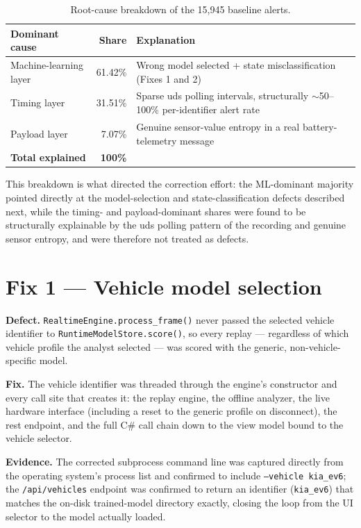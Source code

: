 \begin{table}[H]
\centering
\caption{Root-cause breakdown of the 15,945 baseline alerts.}
\label{tab:rootcause}
\begin{tabular}{@{}lrl@{}}
\toprule
\textbf{Dominant cause} & \textbf{Share} & \textbf{Explanation} \\
\midrule
Machine-learning layer & 61.42\% & Wrong model selected + state misclassification (Fixes 1 and 2) \\
Timing layer            & 31.51\% & Sparse \gls{uds} polling intervals, structurally $\sim$50--100\% per-identifier alert rate \\
Payload layer            & 7.07\%  & Genuine sensor-value entropy in a real battery-telemetry message \\
\midrule
\textbf{Total explained} & \textbf{100\%} & \\
\bottomrule
\end{tabular}
\end{table}

This breakdown is what directed the correction effort: the ML-dominant majority pointed directly at the model-selection and state-classification defects described next, while the timing- and payload-dominant shares were found to be structurally explainable by the \gls{uds} polling pattern of the recording and genuine sensor entropy, and were therefore not treated as defects.

\section{Fix 1 — Vehicle model selection}

\textbf{Defect.} \texttt{RealtimeEngine.process\_frame()} never passed the selected vehicle identifier to \texttt{RuntimeModelStore.score()}, so every replay — regardless of which vehicle profile the analyst selected — was scored with the generic, non-vehicle-specific model.

\textbf{Fix.} The vehicle identifier was threaded through the engine's constructor and every call site that creates it: the replay engine, the offline analyzer, the live hardware interface (including a reset to the generic profile on disconnect), the \gls{rest} endpoint, and the full C\# call chain down to the view model bound to the vehicle selector.

\textbf{Evidence.} The corrected subprocess command line was captured directly from the operating system's process list and confirmed to include \texttt{--vehicle kia\_ev6}; the \texttt{/api/vehicles} endpoint was confirmed to return an identifier (\texttt{kia\_ev6}) that matches the on-disk trained-model directory exactly, closing the loop from the UI selector to the model actually loaded.

